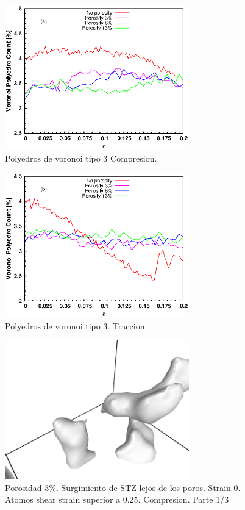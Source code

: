 \documentclass[10pt, oneside]{article} %
\begin{document}

\begin{figure}[H]
\centering
\includegraphics[width=8cm]{Figures/porosity_tipe3_strain_comp.eps}
\caption{Polyedros de voronoi tipo 3 Compresion.}
\end{figure}

\begin{figure}[H]
\centering
\includegraphics[width=8cm]{Figures/porosity_tipe3_strain_tens.eps}
\caption{Polyedros de voronoi tipo 3. Traccion}
\end{figure}

\begin{figure}[H]
\centering
\includegraphics[width=8cm]{Figures/porosidad_STZObservation_3_0.png}
\caption{Porosidad 3\%. Surgimiento de STZ lejos de los poros. Strain 0. Atomos shear strain superior a 0.25. Compresion. Parte 1/3}
\end{figure}
\end{document}

